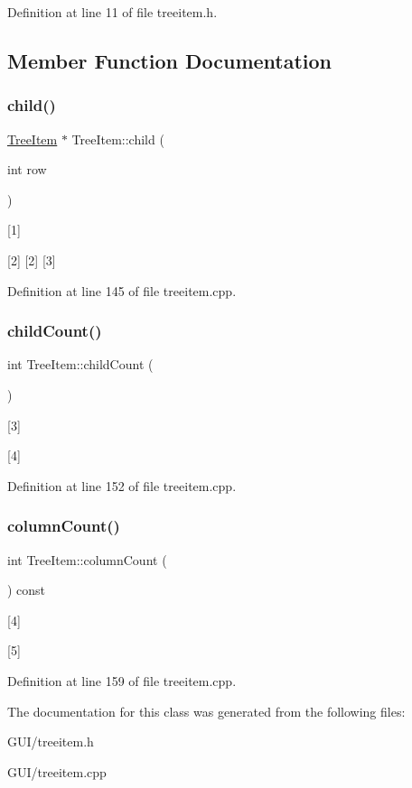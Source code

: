 Definition at line 11 of file treeitem.\+h.



\subsection{Member Function Documentation}
\mbox{\label{class_tree_item_a80ab3164e41c8a43f1a9ef7255d88249}} 
\subsubsection{\texorpdfstring{child()}{child()}}
{\footnotesize\ttfamily \hyperlink{class_tree_item}{Tree\+Item} $\ast$ Tree\+Item\+::child (\begin{DoxyParamCaption}\item[{int}]{row }\end{DoxyParamCaption})}



\mbox{[}1\mbox{]} 

\mbox{[}2\mbox{]} \mbox{[}2\mbox{]} \mbox{[}3\mbox{]} 

Definition at line 145 of file treeitem.\+cpp.

\mbox{\label{class_tree_item_aab845511f8626b68b59fe8681eab8e8c}} 
\subsubsection{\texorpdfstring{child\+Count()}{childCount()}}
{\footnotesize\ttfamily int Tree\+Item\+::child\+Count (\begin{DoxyParamCaption}{ }\end{DoxyParamCaption})}



\mbox{[}3\mbox{]} 

\mbox{[}4\mbox{]} 

Definition at line 152 of file treeitem.\+cpp.

\mbox{\label{class_tree_item_a3314c3678d8ea4dee2f736c32f7b28b9}} 
\subsubsection{\texorpdfstring{column\+Count()}{columnCount()}}
{\footnotesize\ttfamily int Tree\+Item\+::column\+Count (\begin{DoxyParamCaption}{ }\end{DoxyParamCaption}) const}



\mbox{[}4\mbox{]} 

\mbox{[}5\mbox{]} 

Definition at line 159 of file treeitem.\+cpp.



The documentation for this class was generated from the following files\+:\begin{DoxyCompactItemize}
\item 
G\+U\+I/treeitem.\+h\item 
G\+U\+I/treeitem.\+cpp\end{DoxyCompactItemize}
